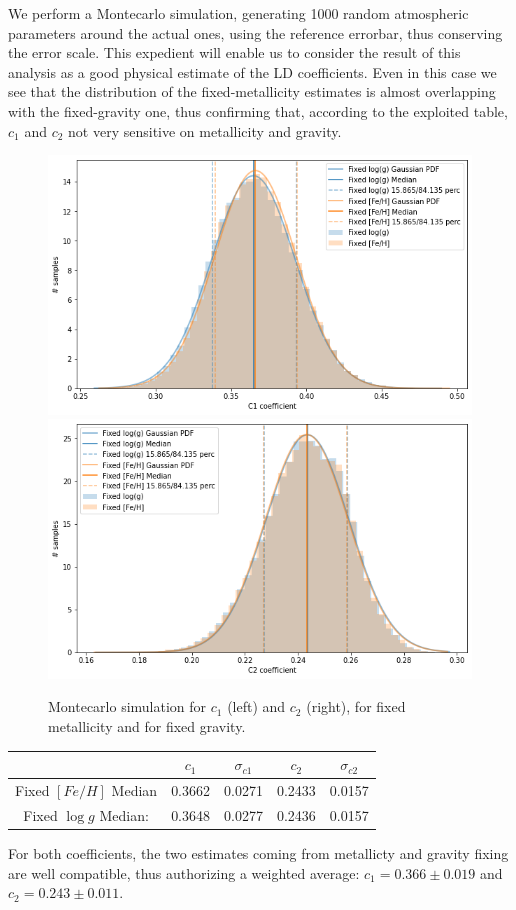 \documentclass{aa}
\begin{document}
We perform a Montecarlo simulation, generating 1000 random atmospheric 
parameters around the actual ones, using the reference errorbar, 
thus conserving the error scale. This expedient will enable us 
to consider the result of this analysis as a good physical 
estimate of the LD coefficients. 
Even in this case we see that the 
distribution of the fixed-metallicity estimates is almost overlapping 
with the fixed-gravity one, thus confirming that, according to the 
exploited table, $c_1$ and $c_2$ not very sensitive on metallicity and gravity.
\begin{figure}[h]
    \centering  
    \includegraphics[scale=0.35, angle=0]{pictures/2017_c1_comp}
    \includegraphics[scale=0.35, angle=0]{pictures/2017_c2_comp}
    \caption{Montecarlo simulation for $c_1$ (left) and $c_2$ (right), 
    for fixed metallicity and for fixed gravity.}
\end{figure}
\begin{table}[h!]
	\centering
	\begin{tabular}{ccccc}
		\hline
		& $c_1$ & $\sigma_{c1}$ & $c_2$ & $\sigma_{c2}$\\
		\hline
		Fixed $[Fe/H]$ Median   & 0.3662 & 0.0271 & 0.2433 & 0.0157\\
		Fixed $\log{g}$ Median: & 0.3648 & 0.0277 & 0.2436 & 0.0157 \\
		\hline
	\end{tabular} 
\end{table}
For both coefficients, the two estimates coming from metallicty and 
gravity fixing are well compatible, thus authorizing a weighted average: 
$c_1 = 0.366 \pm 0.019$ and $c_2 = 0.243 \pm 0.011$.
\end{document}
